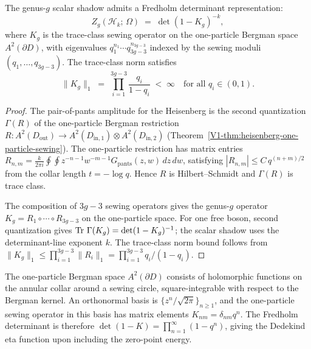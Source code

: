 \begin{proposition}
The genus-$g$ scalar shadow admits a Fredholm determinant representation:
\begin{equation}%
Z_g(\mathcal{H}_k;\,\Omega) \;=\; \det(1 - K_g)^{-k},
\end{equation}
where $K_g$ is the trace-class sewing operator on the one-particle Bergman space $A^2(\partial D)$, with eigenvalues $q_1^{n_1} \cdots q_{3g-3}^{n_{3g-3}}$ indexed by the sewing moduli $(q_1, \ldots, q_{3g-3})$. The trace-class norm satisfies
\begin{equation}%
\|K_g\|_1 \;=\; \prod_{i=1}^{3g-3} \frac{q_i}{1-q_i} \;<\; \infty \quad\text{for all } q_i \in (0,1).
\end{equation}
\end{proposition}

\begin{proof}
The pair-of-pants amplitude for the Heisenberg is the second quantization $\Gamma(R)$ of the one-particle Bergman restriction $R \colon A^2(D_{\mathrm{out}}) \to A^2(D_{\mathrm{in},1}) \otimes A^2(D_{\mathrm{in},2})$ (Theorem~\ref{V1-thm:heisenberg-one-particle-sewing}). The one-particle restriction has matrix entries $R_{n,m} = \frac{k}{2\pi i} \oint\oint z^{-n-1}w^{-m-1}G_{\mathrm{pants}}(z,w)\,dz\,dw$, satisfying $|R_{n,m}| \leq C\,q^{(n+m)/2}$ from the collar length $t = -\log q$. Hence $R$ is Hilbert--Schmidt and $\Gamma(R)$ is trace class.

The composition of $3g - 3$ sewing operators gives the genus-$g$ operator $K_g = R_1 \circ \cdots \circ R_{3g-3}$ on the one-particle space. For one free boson, second quantization gives $\operatorname{Tr}\,\Gamma(K_g)=\det(1-K_g)^{-1}$; the scalar shadow uses the determinant-line exponent $k$. The trace-class norm bound follows from $\|K_g\|_1 \leq \prod_{i=1}^{3g-3} \|R_i\|_1 = \prod_{i=1}^{3g-3} q_i/(1-q_i)$.
\end{proof}

\begin{remark}
The one-particle Bergman space $A^2(\partial D)$ consists of holomorphic functions on the annular collar around a sewing circle, square-integrable with respect to the Bergman kernel. An orthonormal basis is $\{z^n / \sqrt{2\pi}\}_{n \geq 1}$, and the one-particle sewing operator in this basis has matrix elements $K_{nm} = \delta_{nm} q^n$. The Fredholm determinant is therefore $\det(1 - K) = \prod_{n=1}^\infty (1 - q^n)$, giving the Dedekind eta function upon including the zero-point energy.
\end{remark}

